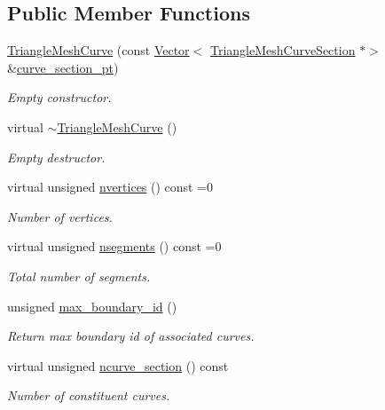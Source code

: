\subsection*{Public Member Functions}
\begin{DoxyCompactItemize}
\item 
\hyperlink{classoomph_1_1TriangleMeshCurve_a98c1c95a35c0ba3843a2dc0982ea3185}{Triangle\+Mesh\+Curve} (const \hyperlink{classoomph_1_1Vector}{Vector}$<$ \hyperlink{classoomph_1_1TriangleMeshCurveSection}{Triangle\+Mesh\+Curve\+Section} $\ast$$>$ \&\hyperlink{classoomph_1_1TriangleMeshCurve_a8a8d36c6b35f1bffd760877da4f3d52f}{curve\+\_\+section\+\_\+pt})
\begin{DoxyCompactList}\small\item\em Empty constructor. \end{DoxyCompactList}\item 
virtual \hyperlink{classoomph_1_1TriangleMeshCurve_aa7fc18e6612c6f82775c3320175acb45}{$\sim$\+Triangle\+Mesh\+Curve} ()
\begin{DoxyCompactList}\small\item\em Empty destructor. \end{DoxyCompactList}\item 
virtual unsigned \hyperlink{classoomph_1_1TriangleMeshCurve_acf002aab11af44361b39729d067efbe2}{nvertices} () const =0
\begin{DoxyCompactList}\small\item\em Number of vertices. \end{DoxyCompactList}\item 
virtual unsigned \hyperlink{classoomph_1_1TriangleMeshCurve_abb1f60baf8d94f54f409ae51417e2568}{nsegments} () const =0
\begin{DoxyCompactList}\small\item\em Total number of segments. \end{DoxyCompactList}\item 
unsigned \hyperlink{classoomph_1_1TriangleMeshCurve_ad5094b69c9f72db4b079d71c3c9f1ea8}{max\+\_\+boundary\+\_\+id} ()
\begin{DoxyCompactList}\small\item\em Return max boundary id of associated curves. \end{DoxyCompactList}\item 
virtual unsigned \hyperlink{classoomph_1_1TriangleMeshCurve_af0b316414dd4a848b8bdfe314e5200ea}{ncurve\+\_\+section} () const
\begin{DoxyCompactList}\small\item\em Number of constituent curves. \end{DoxyCompactList}\item 
$$
\end{DoxyCompactItemize}
